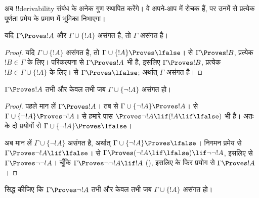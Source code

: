 \documentclass[../../../include/open-logic-section]{subfiles}
\begin{document}
      {}
      {}


अब !!{derivability} संबंध के अनेक गुण स्थापित करेंगे। वे अपने-आप में रोचक
हैं, पर उनमें से प्रत्येक पूर्णता प्रमेय के प्रमाण में भूमिका निभाएगा।

\begin{prop}
  यदि $\Gamma \Proves !A$ और $\Gamma \cup \{!A\}$ असंगत है, तो
  $\Gamma$ असंगत है।
\end{prop}

\begin{proof}
  यदि $\Gamma \cup \{!A\}$ असंगत है, तो $\Gamma \cup \{!A\}
  \Proves \lfalse$।  से $\Gamma \Proves
  !B$, प्रत्येक $!B \in \Gamma$ के लिए। परिकल्पना से $\Gamma \Proves !A$
  भी है, इसलिए $\Gamma \Proves !B$, प्रत्येक $!B \in \Gamma \cup
  \{!A\}$ के लिए।  से $\Gamma \Proves
  \lfalse$; अर्थात् $\Gamma$ असंगत है।
\end{proof}

\begin{prop}
$\Gamma \Proves !A$ तभी और केवल तभी जब $\Gamma \cup \{\lnot !A\}$
असंगत हो।
\end{prop}

\begin{proof}
पहले मान लें $\Gamma \Proves !A$। तब  से
$\Gamma \cup \{\lnot !A\}
\Proves !A$।  से $\Gamma \cup \{\lnot
!A\} \Proves \lnot !A$।  से हमारे पास
$\Proves \lnot !A \lif (!A \lif \lfalse)$ भी है। अतः
 के दो प्रयोगों से $\Gamma \cup \{\lnot
!A\} \Proves \lfalse$।

अब मान लें $\Gamma \cup \{\lnot !A\}$ असंगत है, अर्थात् $\Gamma
\cup \{\lnot !A\} \Proves \lfalse$। निगमन प्रमेय से $\Gamma
\Proves \lnot !A \lif \lfalse$।  से
$\Gamma \Proves (\lnot !A \lif
\lfalse) \lif \lnot\lnot !A$, इसलिए  से $\Gamma
\Proves \lnot\lnot !A$। चूँकि $\Gamma \Proves
\lnot\lnot !A \lif !A$ (), इसलिए
 के फिर प्रयोग से $\Gamma
\Proves !A$।
\end{proof}

\begin{prob}
सिद्ध कीजिए कि $\Gamma \Proves \lnot !A$ तभी और केवल तभी जब
$\Gamma \cup \{!A\}$ असंगत हो।
\end{prob}
\end{document}
